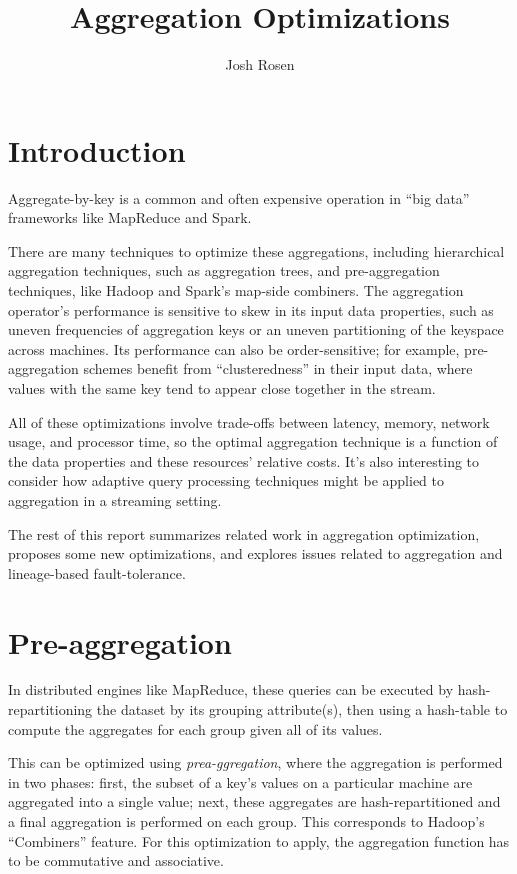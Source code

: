 \documentclass[12pt]{article}
\title{Aggregation Optimizations}
\author{Josh Rosen}
\begin{document}
\maketitle

\section{Introduction}

Aggregate-by-key is a common and often expensive operation in ``big data'' frameworks like MapReduce and Spark.

There are many techniques to optimize these aggregations, including hierarchical aggregation techniques, such as aggregation trees, and pre-aggregation techniques, like Hadoop and Spark's map-side combiners.
The aggregation operator's performance is sensitive to skew in its input data properties, such as uneven frequencies of aggregation keys or an uneven partitioning of the keyspace across machines.
Its performance can also be order-sensitive; for example, pre-aggregation schemes benefit from ``clusteredness'' in their input data, where values with the same key tend to appear close together in the stream.

All of these optimizations involve trade-offs between latency, memory, network usage, and processor time, so the optimal aggregation technique is a function of the data properties and these resources' relative costs.
It's also interesting to consider how adaptive query processing techniques might be applied to aggregation in a streaming setting.

The rest of this report summarizes related work in aggregation optimization, proposes some new optimizations, and explores issues related to aggregation and lineage-based fault-tolerance.

\section{Pre-aggregation}

In distributed engines like MapReduce, these queries can be executed by hash-repartitioning the dataset by its grouping attribute(s), then using a hash-table to compute the aggregates for each group given all of its values.

This can be optimized using \emph{prea-ggregation}, where the aggregation is performed in two phases: first, the subset of a key's values on a particular machine are aggregated into a single value; next, these aggregates are hash-repartitioned and a final aggregation is performed on each group.
This corresponds to Hadoop's ``Combiners'' feature.
For this optimization to apply, the aggregation function has to be commutative and associative.
\end{document}
